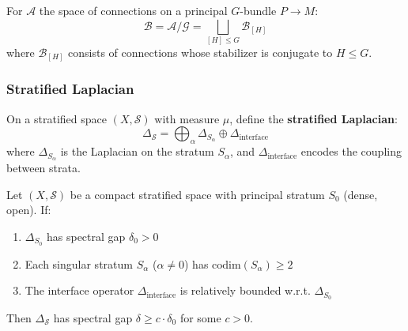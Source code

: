 \begin{definition}
For $\mathcal{A}$ the space of connections on a principal $G$-bundle $P \to M$:
\[
\mathcal{B} = \mathcal{A}/\mathcal{G} = \bigsqcup_{[H] \leq G} \mathcal{B}_{[H]}
\]
where $\mathcal{B}_{[H]}$ consists of connections whose stabilizer is conjugate to $H \leq G$.
\end{definition}

\subsubsection{Stratified Laplacian}

\begin{definition}
On a stratified space $(X, \mathcal{S})$ with measure $\mu$, define the \textbf{stratified Laplacian}:
\[
\Delta_{\mathcal{S}} = \bigoplus_{\alpha} \Delta_{S_\alpha} \oplus \Delta_{\text{interface}}
\]
where $\Delta_{S_\alpha}$ is the Laplacian on the stratum $S_\alpha$, and $\Delta_{\text{interface}}$ encodes the coupling between strata.
\end{definition}

\begin{theorem}\label{thm:transfer}
Let $(X, \mathcal{S})$ be a compact stratified space with principal stratum $S_0$ (dense, open). If:
\begin{enumerate}[label=(\roman*)]
\item $\Delta_{S_0}$ has spectral gap $\delta_0 > 0$
\item Each singular stratum $S_\alpha$ ($\alpha \neq 0$) has $\text{codim}(S_\alpha) \geq 2$
\item The interface operator $\Delta_{\text{interface}}$ is relatively bounded w.r.t. $\Delta_{S_0}$
\end{enumerate}
Then $\Delta_{\mathcal{S}}$ has spectral gap $\delta \geq c \cdot \delta_0$ for some $c > 0$.
\end{theorem}


